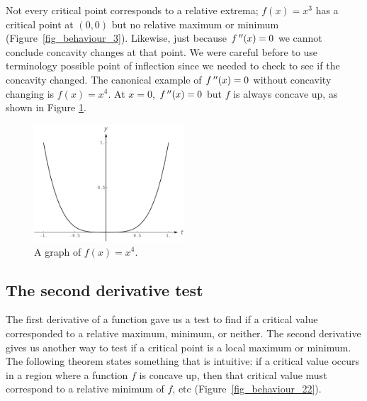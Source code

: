 \begin{example}
\end{example}

Not every critical point corresponds to a relative extrema; $f(x)=x^3$ has a critical point at $(0,0)$ but no relative maximum or minimum (Figure~\ref{fig_behaviour_3}). Likewise, just because $f\,''(x)=0$ we cannot conclude concavity changes at that point. We were careful before to use terminology possible point of inflection since we needed to check to see if the concavity changed. The canonical example of $f\,''(x)=0$ without concavity changing is $f(x)=x^4$. At $x=0$, $f\,''(x)=0$ but $f$ is always concave up, as shown in Figure \ref{fig_behaviour_21}.

\begin{figure}[H]
	\begin{center}
			\includegraphics[width=0.5\textwidth]{fig_behaviour_21}
	\caption{A graph of $f(x) = x^4$.}
	\label{fig_behaviour_21}
	\end{center}
\end{figure}

\subsection{The second derivative test}


The first derivative of a function gave us a test to find if a critical value corresponded to a relative maximum, minimum, or neither. The second derivative gives us another way to test if a critical point is a local maximum or minimum. The following theorem states something that is intuitive: if a critical value occurs in a region where a function $f$ is concave up, then that critical value must correspond to a relative minimum of $f$, etc (Figure~\ref{fig_behaviour_22}).

